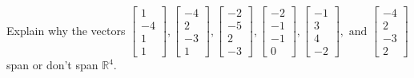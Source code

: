 \documentclass{article}
\begin{document}
\begin{exerciseStatement}
    Explain why the vectors \(\left[\begin{array}{r}
1 \\
-4 \\
1 \\
1
\end{array}\right] , \left[\begin{array}{r}
-4 \\
2 \\
-3 \\
1
\end{array}\right] , \left[\begin{array}{r}
-2 \\
-5 \\
2 \\
-3
\end{array}\right] , \left[\begin{array}{r}
-2 \\
-1 \\
-1 \\
0
\end{array}\right] , \left[\begin{array}{r}
-1 \\
3 \\
4 \\
-2
\end{array}\right] , \text{ and } \left[\begin{array}{r}
-4 \\
2 \\
-3 \\
2
\end{array}\right]\) span or don't span \(\mathbb{R}^4\).



  
\end{exerciseStatement}
\end{document}
